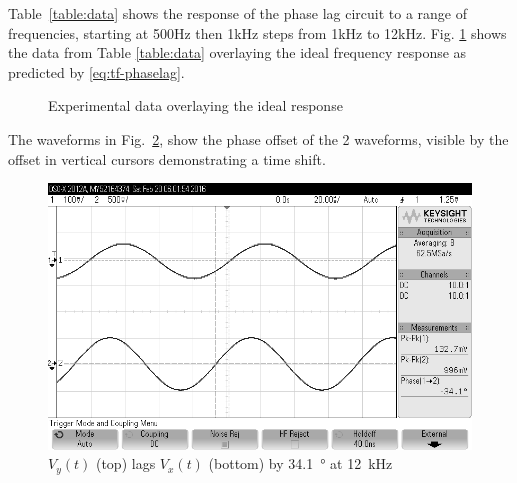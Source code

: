 Table~\ref{table:data} shows the response of the phase lag circuit to a range of frequencies, starting at 500\si{\hertz} then 1\si{\kilo\hertz} steps from 1\si{\kilo\hertz} to 12\si{\kilo\hertz}.
Fig. \ref{fig:freq-response} shows the data from Table \ref{table:data} overlaying the ideal frequency response as predicted by \eqref{eq:tf-phaselag}.

\begin{figure}[htpb]
	\centering
	\caption{Experimental data overlaying the ideal response}
	\label{fig:freq-response}
\end{figure}

The waveforms in Fig.~\ref{fig:scope}, show the phase offset of the 2 waveforms, visible by the offset in vertical cursors demonstrating a time shift.

\begin{figure}[tbph]
	\centering
	\includegraphics[width=0.65\linewidth]{graphics/12khz_phase_lag}
	\caption{$V_y(t)$ (top) lags $V_x(t)$ (bottom) by \SI{34.1}{\degree} at \SI{12}{\kilo\hertz}}
	\label{fig:scope}
\end{figure}
